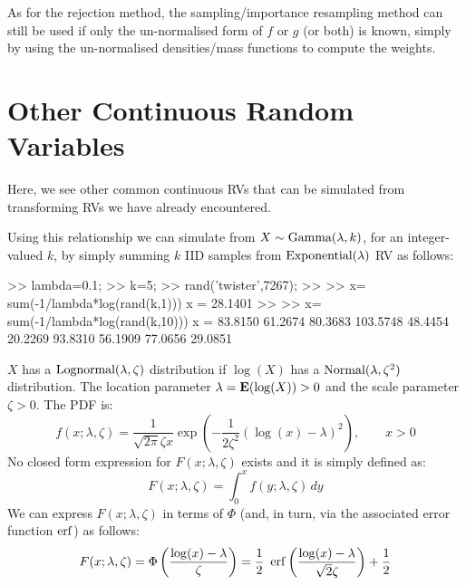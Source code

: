 As for the rejection method, the sampling/importance resampling method can still be used if only the un-normalised form of $f$ or $g$ (or both) is known, simply by using the un-normalised densities/mass functions to compute the weights.

\section{Other Continuous Random Variables}\label{S:OtherContRVs}
Here, we see other common continuous RVs that can be simulated from transforming RVs we have already encountered.
\begin{simulation}\label{SIM:Gamma}
Using this relationship we can simulate from $X \sim \mbox{{\rm Gamma}}(\lambda,k)$, for an integer-valued $k$, by simply summing $k$ IID samples from $\mbox{{\rm Exponential}}(\lambda)$ RV as follows:
\begin{VrbM}
>> lambda=0.1; %
>> k=5; %
>> rand('twister',7267); %
>> %
>> x= sum(-1/lambda*log(rand(k,1)))
x =   28.1401
>> %
>> x= sum(-1/lambda*log(rand(k,10)))
x =
   83.8150   61.2674   80.3683  103.5748   48.4454   20.2269   93.8310   56.1909   77.0656   29.0851
\end{VrbM}
\end{simulation}

\begin{model}[$\lognormal(\lambda,\zeta)$]
$X$ has a $\lognormal(\lambda,\zeta) $ distribution if $\log(X)$ has a $\mbox{{\rm Normal}}(\lambda,\zeta^2)$ distribution.  The location parameter $\lambda = \mathbf{E}(\log(X)) > 0$ and the scale parameter $\zeta > 0$.  The PDF is:
\begin{equation}\label{E:LogNormalpdf}
f(x; \lambda, \zeta) = \frac{1}{\sqrt{2 \pi} \zeta x }
 \exp{\left( - \frac{1}{2 \zeta^2} (\log(x)-\lambda)^2 \right)}, \qquad x > 0
\end{equation}
No closed form expression for $F(x;\lambda,\zeta)$ exists and it is simply defined as:
\[
F(x;\lambda,\zeta) = \int_{0}^x f (y;\lambda,\zeta)\,dy
\]
We can express $F(x;\lambda,\zeta) $ in terms of $\Phi$ (and, in turn, via the associated  error function $\operatorname{erf}$) as follows:
\begin{equation}\label{E:DFLogNormalviaErf}
F(x;\lambda,\zeta) = \Phi \left( \frac{\log(x) - \lambda}{\zeta} \right) = \frac{1}{2} \ \operatorname{erf} \left(  \frac{\log(x)-\lambda}{\sqrt{2}\zeta} \right)+ \frac{1}{2}
\end{equation}
\end{model}

